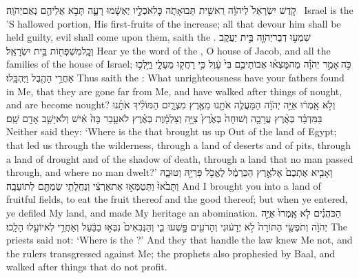 {קֹ֤דֶשׁ יִשְׂרָאֵל֙ לַיהֹוָ֔ה רֵאשִׁ֖ית תְּבוּאָתֹ֑ה כׇּל\maqqaf אֹכְלָ֣יו יֶאְשָׁ֔מוּ רָעָ֛ה תָּבֹ֥א אֲלֵיהֶ֖ם נְאֻם\maqqaf יְהֹוָֽה׃ \petucha }
{Israel is the \lord’S hallowed portion, His first-fruits of the increase; all that devour him shall be held guilty, evil shall come upon them, saith the \lord.}
\newperek
{}
\label{haft_43}
\setcounter{chap}{2}
\setcounter{verse}{4}
{שִׁמְע֥וּ דְבַר\maqqaf יְהֹוָ֖ה בֵּ֣ית יַעֲקֹ֑ב וְכׇֽל\maqqaf מִשְׁפְּח֖וֹת בֵּ֥ית יִשְׂרָאֵֽל׃}
{Hear ye the word of the \lord, O house of Jacob, and all the families of the house of Israel;}
{כֹּ֣ה \legarmeh  אָמַ֣ר יְהֹוָ֗ה מַה\maqqaf מָּצְא֨וּ אֲבוֹתֵיכֶ֥ם בִּי֙ עָ֔וֶל כִּ֥י רָחֲק֖וּ מֵעָלָ֑י וַיֵּ֥לְכ֛וּ אַחֲרֵ֥י הַהֶ֖בֶל וַיֶּהְבָּֽלוּ׃}
{Thus saith the \lord: What unrighteousness have your fathers found in Me, that they are gone far from Me, and have walked after things of nought, and are become nought?}
{וְלֹ֣א אָֽמְר֔וּ אַיֵּ֣ה יְהֹוָ֔ה הַמַּעֲלֶ֥ה אֹתָ֖נוּ מֵאֶ֣רֶץ מִצְרָ֑יִם הַמּוֹלִ֨יךְ אֹתָ֜נוּ בַּמִּדְבָּ֗ר בְּאֶ֨רֶץ עֲרָבָ֤ה וְשׁוּחָה֙ בְּאֶ֙רֶץ֙ צִיָּ֣ה וְצַלְמָ֔וֶת בְּאֶ֗רֶץ לֹא\maqqaf עָ֤בַר בָּהּ֙ אִ֔ישׁ וְלֹא\maqqaf יָשַׁ֥ב אָדָ֖ם שָֽׁם׃}
{Neither said they: ‘Where is the \lord\space that brought us up Out of the land of Egypt; that led us through the wilderness, through a land of deserts and of pits, through a land of drought and of the shadow of death, through a land that no man passed through, and where no man dwelt?’}
{וָאָבִ֤יא אֶתְכֶם֙ אֶל\maqqaf אֶ֣רֶץ הַכַּרְמֶ֔ל לֶאֱכֹ֥ל פִּרְיָ֖הּ וְטוּבָ֑הּ וַתָּבֹ֙אוּ֙ וַתְּטַמְּא֣וּ אֶת\maqqaf אַרְצִ֔י וְנַחֲלָתִ֥י שַׂמְתֶּ֖ם לְתוֹעֵבָֽה׃}
{And I brought you into a land of fruitful fields, to eat the fruit thereof and the good thereof; but when ye entered, ye defiled My land, and made My heritage an abomination.}
{הַכֹּהֲנִ֗ים לֹ֤א אָֽמְרוּ֙ אַיֵּ֣ה יְהֹוָ֔ה וְתֹפְשֵׂ֤י הַתּוֹרָה֙ לֹ֣א יְדָע֔וּנִי וְהָרֹעִ֖ים פָּ֣שְׁעוּ בִ֑י וְהַנְּבִאִים֙ נִבְּא֣וּ בַבַּ֔עַל וְאַחֲרֵ֥י לֹֽא\maqqaf יוֹעִ֖לוּ הָלָֽכוּ׃}
{The priests said not: ‘Where is the \lord?’ And they that handle the law knew Me not, and the rulers transgressed against Me; the prophets also prophesied by Baal, and walked after things that do not profit.}
